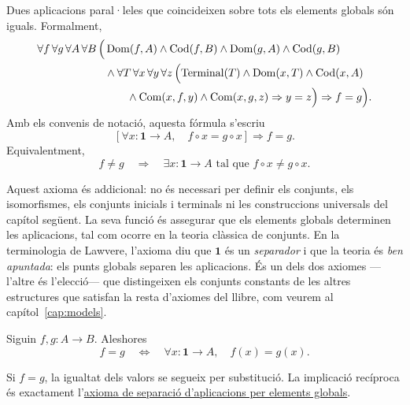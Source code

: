 \begin{axioma}\label{ax:separacio-globals}
Dues aplicacions paral·leles que coincideixen sobre tots els elements globals són iguals. Formalment,
\[
\begin{aligned}
\forall f\,\forall g\,\forall A\,\forall B\,\Bigl(&
\operatorname{Dom}(f,A)\land\operatorname{Cod}(f,B)\land
\operatorname{Dom}(g,A)\land\operatorname{Cod}(g,B)
\\
&{}\land
\forall T\,\forall x\,\forall y\,\forall z\,
\Bigl(
\operatorname{Terminal}(T)\land\operatorname{Dom}(x,T)\land\operatorname{Cod}(x,A)
\\
&\qquad{}\land\operatorname{Com}(x,f,y)\land\operatorname{Com}(x,g,z)
\Rightarrow y=z
\Bigr)
\Rightarrow f=g
\Bigr).
\end{aligned}
\]
Amb els convenis de notació, aquesta fórmula s'escriu
\[
\left[
\forall x:\mathbf1\to A,\quad f\circ x=g\circ x
\right]
\Longrightarrow f=g.
\]
Equivalentment,
\[
f\ne g
\quad\Longrightarrow\quad
\exists x:\mathbf1\to A
\text{ tal que }
f\circ x\ne g\circ x.
\]
\end{axioma}

Aquest axioma és addicional: no és necessari per definir els conjunts, els isomorfismes, els conjunts inicials i terminals ni les construccions universals del capítol següent. La seva funció és assegurar que els elements globals determinen les aplicacions, tal com ocorre en la teoria clàssica de conjunts. En la terminologia de Lawvere, l'axioma diu que \(\mathbf1\) és un \emph{separador} i que la teoria és \emph{ben apuntada}: els punts globals separen les aplicacions. És un dels dos axiomes ---l'altre és l'elecció--- que distingeixen els conjunts constants de les altres estructures que satisfan la resta d'axiomes del llibre, com veurem al capítol~\ref{cap:models}.

\begin{proposicio}\label{prop:extensionalitat-global}
Siguin \(f,g:A\to B\). Aleshores
\[
f=g
\quad\Longleftrightarrow\quad
\forall x:\mathbf1\to A,\quad f(x)=g(x).
\]
\end{proposicio}

\begin{prova}
Si \(f=g\), la igualtat dels valors se segueix per substitució. La implicació recíproca és exactament l'\hyperref[ax:separacio-globals]{axioma de separació d'aplicacions per elements globals}.
\end{prova}

